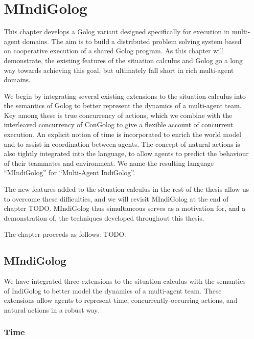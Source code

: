 


\chapter{MIndiGolog}

\label{ch:mindigolog}

This chapter develops a Golog variant designed specifically for execution
in multi-agent domains. The aim is to build a distributed problem
solving system based on cooperative execution of a shared Golog program.
As this chapter will demonstrate, the existing features of the situation
calculus and Golog go a long way towards achieving this goal, but
ultimately fall short in rich multi-agent domains.

We begin by integrating several existing extensions to the situation
calculus into the semantics of Golog to better represent the dynamics
of a multi-agent team. Key among these is true concurrency of actions,
which we combine with the interleaved concurrency of ConGolog to give
a flexible account of concurrent execution. An explicit notion of
time is incorporated to enrich the world model and to assist in coordination
between agents. The concept of natural actions is also tightly integrated
into the language, to allow agents to predict the behaviour of their
teammates and environment. We name the resulting language {}``MIndiGolog''
for {}``Multi-Agent IndiGolog''.

The new features added to the situation calculus in the rest of the
thesis allow us to overcome these difficulties, and we will revisit
MIndiGolog at the end of chapter TODO. MIndiGolog thus simultaneous
serves as a motivation for, and a demonstration of, the techniques
developed throughout this thesis.

The chapter proceeds as follows: TODO.


\section{MIndiGolog\label{sec:MIndiGolog}}

We have integrated three extensions to the situation calculus with
the semantics of IndiGolog to better model the dynamics of a multi-agent
team. These extensions allow agents to represent time, concurrently-occurring
actions, and natural actions in a robust way.


\subsection{Time}

